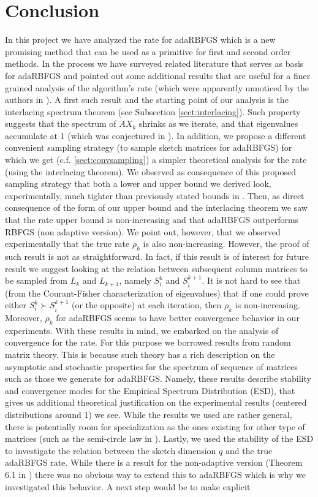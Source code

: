 \documentclass[12pt,conference,compsocconf]{IEEEtran}
\begin{document}
\section{Conclusion}\label{sect:conclusion}
In this project we have analyzed the rate for adaRBFGS which is a new promising method that can be used as a primitive for first and second order methods. In the process we have surveyed related literature that serves as basis for adaRBFGS and pointed out some additional results that are useful for a finer grained analysis of the algorithm's rate (which were apparently unnoticed by the authors in \cite{Gower1}). A first such result and the starting point of our analysis is the interlacing spectrum theorem (see Subsection \ref{sect:interlacing}). Such property suggests that the spectrum of $AX_k$ shrinks as we iterate, and that eigenvalues accumulate at 1 (which was conjectured in \cite{Gower1}). In addition, we propose a different convenient sampling strategy (to sample sketch matrices for adaRBFGS) for which we get (c.f. \ref{sect:convsampling}) a simpler theoretical analysis for the rate (using the interlacing theorem). We observed as consequence of this proposed sampling strategy that both a lower and upper bound we derived look, experimentally, much tighter than previously stated bounds in \cite{Gower1}. Then, as direct consequence of the form of our upper bound and the interlacing theorem we saw that the rate upper bound is non-increasing and that adaRBFGS outperforms RBFGS (non adaptive version). We point out, however, that we observed experimentally that the true rate $\rho_k$ is also non-increasing. However, the proof of such result is not as straightforward. In fact, if this result is of interest for future result we suggest looking at the relation between subsequent column matrices to be sampled from $L_k$ and $L_{k+1}$, namely $S_i^k$ and $S_i^{k+1}$. It is not hard to see that (from the Courant-Fisher characterization of eigenvalues) that if one could prove either $S_i^k \succ S_i^{k+1}$ (or the opposite) at each iteration, then $\rho_k$ is non-increasing. Moreover, $\rho_k$ for adaRBFGS seems to have better convergence behavior in our experiments. With these results in mind, we embarked on the analysis of convergence for the rate. For this purpose we borrowed results from random matrix theory. This is because such theory has a rich description on the asymptotic and stochastic properties for the spectrum of sequence of matrices such as those we generate for adaRBFGS. Namely, these results describe stability and convergence modes for the Empirical Spectrum Distribution (ESD), that gives us additional theoretical justification on the experimental results (centered distributions around 1) we see. While the results we used are rather general, there is potentially room for specialization as the ones existing for other type of matrices (such as the semi-circle law in \cite{Tao}). Lastly, we used the stability of the ESD to investigate the relation between the sketch dimension $q$ and the true adaRBFGS rate. While there is a result for the non-adaptive version (Theorem 6.1 in \cite{Gower1}) there was no obvious way to extend this to adaRBFGS which is why we investigated this behavior. A next step would be to make explicit 
\end{document}
